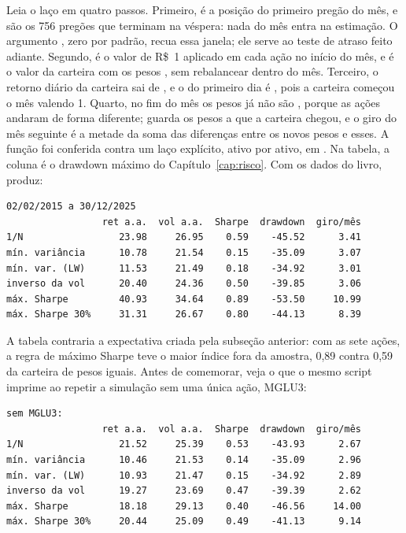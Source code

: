 Leia o laço em quatro passos. Primeiro,  é a posição do primeiro pregão do mês, e  são os 756 pregões que terminam na véspera: nada do mês entra na estimação. O argumento , zero por padrão, recua essa janela; ele serve ao teste de atraso feito adiante. Segundo,  é o valor de R\$~1 aplicado em cada ação no início do mês, e  é o valor da carteira com os pesos , sem rebalancear dentro do mês. Terceiro, o retorno diário da carteira sai de , e o do primeiro dia é , pois a carteira começou o mês valendo 1. Quarto, no fim do mês os pesos já não são , porque as ações andaram de forma diferente;  guarda os pesos a que a carteira chegou, e o giro do mês seguinte é a metade da soma das diferenças entre os novos pesos e esses. A função foi conferida contra um laço explícito, ativo por ativo, em . Na tabela, a coluna  é o drawdown máximo do Capítulo~\ref{cap:risco}. Com os dados do livro,  produz:

\begin{lstlisting}[style=saida]
02/02/2015 a 30/12/2025
                 ret a.a.  vol a.a.  Sharpe  drawdown  giro/mês
1/N                 23.98     26.95    0.59    -45.52      3.41
mín. variância      10.78     21.54    0.15    -35.09      3.07
mín. var. (LW)      11.53     21.49    0.18    -34.92      3.01
inverso da vol      20.40     24.36    0.50    -39.85      3.06
máx. Sharpe         40.93     34.64    0.89    -53.50     10.99
máx. Sharpe 30%     31.31     26.67    0.80    -44.13      8.39
\end{lstlisting}

A tabela contraria a expectativa criada pela subseção anterior: com as sete ações, a regra de máximo Sharpe teve o maior índice fora da amostra, 0,89 contra 0,59 da carteira de pesos iguais. Antes de comemorar, veja o que o mesmo script imprime ao repetir a simulação sem uma única ação, MGLU3:

\begin{lstlisting}[style=saida]
sem MGLU3:
                 ret a.a.  vol a.a.  Sharpe  drawdown  giro/mês
1/N                 21.52     25.39    0.53    -43.93      2.67
mín. variância      10.46     21.53    0.14    -35.09      2.96
mín. var. (LW)      10.93     21.47    0.15    -34.92      2.89
inverso da vol      19.27     23.69    0.47    -39.39      2.62
máx. Sharpe         18.18     29.13    0.40    -46.56     14.00
máx. Sharpe 30%     20.44     25.09    0.49    -41.13      9.14
\end{lstlisting}

